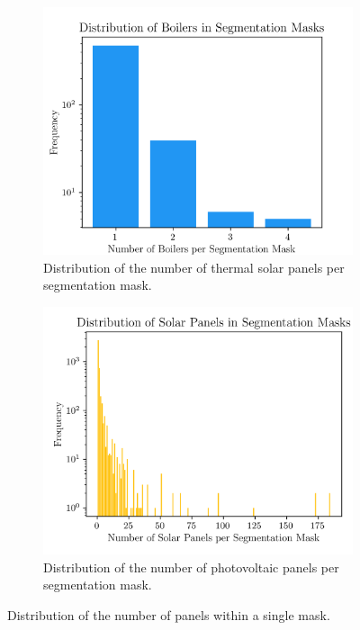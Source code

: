 \documentclass[conference]{IEEEtran}
\begin{document}
\begin{figure}[H]
    \centering
    \begin{subfigure}[b]{\linewidth}
        \centering
        \includegraphics[width=\linewidth]{assets/data_boil_distribution.png}
        \caption{Distribution of the number of thermal solar panels per segmentation mask.}
        \label{fig:data_boil_distribution}
    \end{subfigure}

    \vspace{0.5em} %

    \begin{subfigure}[b]{\linewidth}
        \centering
        \includegraphics[width=\linewidth]{assets/data_panel_distribution.png}
        \caption{Distribution of the number of photovoltaic panels per segmentation mask.}
        \label{fig:data_panel_distribution}
    \end{subfigure}
    \caption{Distribution of the number of panels within a single mask.}
    \label{fig:combined_data_distributions}
\end{figure}
\end{document}
